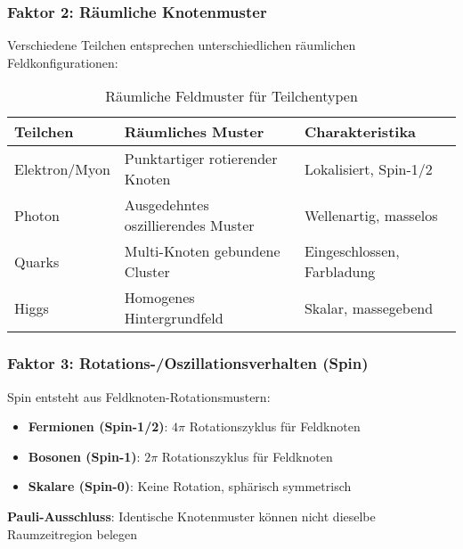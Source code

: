\documentclass[12pt,a4paper]{article}
\newcommand{\mypi}{\ensuremath{\pi}}
\begin{document}
	\subsubsection{Faktor 2: Räumliche Knotenmuster}
	\label{subsubsec:raeumliche_muster}
	
	Verschiedene Teilchen entsprechen unterschiedlichen räumlichen Feldkonfigurationen:
	
	\begin{table}[htbp]
		\centering
		\begin{tabular}{lp{5cm}p{4cm}}
			\toprule
			\textbf{Teilchen} & \textbf{Räumliches Muster} & \textbf{Charakteristika} \\
			\midrule
			Elektron/Myon & Punktartiger rotierender Knoten & Lokalisiert, Spin-1/2 \\
			Photon & Ausgedehntes oszillierendes Muster & Wellenartig, masselos \\
			Quarks & Multi-Knoten gebundene Cluster & Eingeschlossen, Farbladung \\
			Higgs & Homogenes Hintergrundfeld & Skalar, massegebend \\
			\bottomrule
		\end{tabular}
		\caption{Räumliche Feldmuster für Teilchentypen}
		\label{tab:raeumliche_feldmuster}
	\end{table}
	
	\subsubsection{Faktor 3: Rotations-/Oszillationsverhalten (Spin)}
	\label{subsubsec:spin_verhalten}
	
	Spin entsteht aus Feldknoten-Rotationsmustern:
	
	\begin{tcolorbox}[colback=green!5!white,colframe=green!75!black,title=Spin aus Feldknoten-Rotation]
		\begin{itemize}
			\item \textbf{Fermionen (Spin-1/2)}: $4\mypi$ Rotationszyklus für Feldknoten
			\item \textbf{Bosonen (Spin-1)}: $2\mypi$ Rotationszyklus für Feldknoten
			\item \textbf{Skalare (Spin-0)}: Keine Rotation, sphärisch symmetrisch
		\end{itemize}
		
		\textbf{Pauli-Ausschluss}: Identische Knotenmuster können nicht dieselbe Raumzeitregion belegen
	\end{tcolorbox}
	
\end{document}
